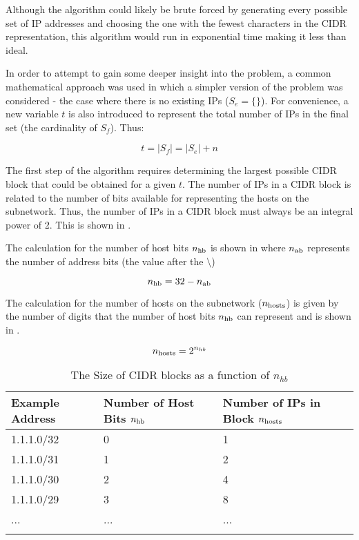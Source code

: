 Although the algorithm could likely be brute forced by generating every possible set of IP addresses and choosing the one with the fewest characters in the CIDR representation, this algorithm would run in exponential time making it less than ideal.

In order to attempt to gain some deeper insight into the problem, a common mathematical approach was used in which a simpler version of the problem was considered - the case where there is no existing IPs ($S_e = \{\}$). For convenience, a new variable $t$ is also introduced to represent the total number of IPs in the final set (the cardinality of $S_f$). Thus:

\begin{equation}
t = |S_f| = |S_e| + n
\end{equation}

The first step of the algorithm requires determining the largest possible CIDR block that could be obtained for a given $t$. The number of IPs in a CIDR block is related to the number of bits available for representing the hosts on the subnetwork. Thus, the number of IPs in a CIDR block must always be an integral power of 2. This is shown in . 

The calculation for the number of host bits $n_\text{hb}$ is shown in  where $n_\text{ab}$ represents the number of address bits (the value after the $\setminus$)

\begin{equation}\label{eq:numHostBits}
n_\text{hb} = 32 - n_\text{ab} 
\end{equation} 

The calculation for the number of hosts on the subnetwork ($n_\text{hosts}$) is given by the number of digits that the number of host bits $n_\text{hb}$ can represent and is shown in .

\begin{equation}\label{eq:numHosts}
n_\text{hosts} = 2 ^ {n_{hb}}
\end{equation}

\begin{table}[H]
\caption{The Size of CIDR blocks as a function of $n_{hb}$}
\label{tbl:cidrBlockSize}
\centering
\begin{tabular}{l l l}
\toprule
\textbf{Example Address} & \textbf{Number of Host Bits $n_\text{hb}$} &\textbf{Number of IPs in Block $n_\text{hosts}$} \\
\midrule
1.1.1.0/32 & 0 & 1\\
1.1.1.0/31 & 1 & 2\\
1.1.1.0/30 & 2 & 4\\
1.1.1.0/29 & 3 & 8\\
... & ... & ...\\
\bottomrule\\
\end{tabular}
\end{table}


